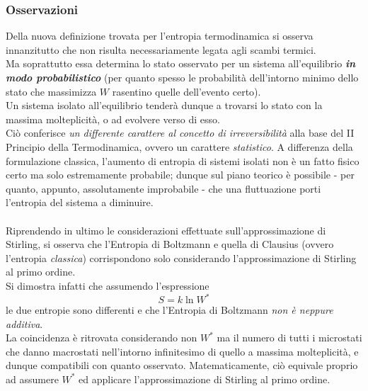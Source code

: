 \documentclass[10pt, oneside]{book}
\begin{document}
\subsubsection*{Osservazioni}
Della nuova definizione trovata per l'entropia termodinamica si osserva innanzitutto che non risulta necessariamente legata agli scambi termici.\\
Ma soprattutto essa determina lo stato osservato per un sistema all'equilibrio \textit{\textbf{in modo probabilistico}} (per quanto spesso le probabilità dell'intorno minimo dello stato che massimizza $W$ rasentino quelle dell'evento certo).\\
Un sistema isolato all'equilibrio tenderà dunque a trovarsi lo stato con la massima molteplicità, o ad evolvere verso di esso.\\
Ciò conferisce \textit{un differente carattere al concetto di irreversibilità} alla base del II Principio della Termodinamica, ovvero un carattere \textit{statistico}. A differenza della formulazione classica, l'aumento di entropia di sistemi isolati non è un fatto fisico certo ma solo estremamente probabile; dunque sul piano teorico è possibile - per quanto, appunto, assolutamente improbabile - che una fluttuazione porti l'entropia del sistema a diminuire.\\~\\
Riprendendo in ultimo le considerazioni effettuate sull'approssimazione di Stirling, si osserva che l'Entropia di Boltzmann e quella di Clausius (ovvero l'entropia \textit{classica}) corrispondono solo considerando l'approssimazione di Stirling al primo ordine.\\ Si dimostra infatti che assumendo l'espressione 
\[S = k \ln W^\ast\]
le due entropie sono differenti e che l'Entropia di Boltzmann \textit{non è neppure additiva}.\\
La coincidenza è ritrovata considerando non $W^\ast$ ma il numero di tutti i microstati che danno macrostati nell'intorno infinitesimo di quello a massima molteplicità, e dunque compatibili con quanto osservato. Matematicamente, ciò equivale proprio ad assumere $W^\ast$ ed applicare l'approssimazione di Stirling al primo ordine.
\end{document}
